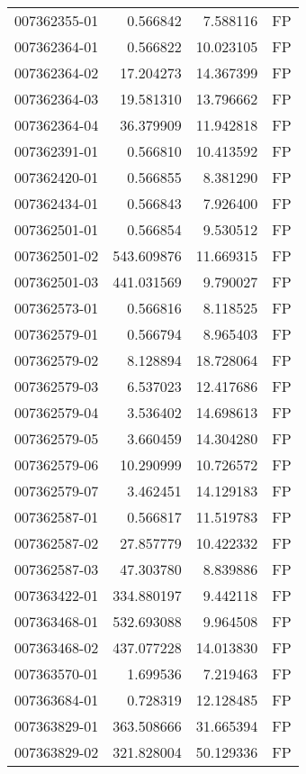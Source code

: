 \begin{tabular}{lrrl}
007362355-01 &    0.566842 &     7.588116 &   FP \\
007362364-01 &    0.566822 &    10.023105 &   FP \\
007362364-02 &   17.204273 &    14.367399 &   FP \\
007362364-03 &   19.581310 &    13.796662 &   FP \\
007362364-04 &   36.379909 &    11.942818 &   FP \\
007362391-01 &    0.566810 &    10.413592 &   FP \\
007362420-01 &    0.566855 &     8.381290 &   FP \\
007362434-01 &    0.566843 &     7.926400 &   FP \\
007362501-01 &    0.566854 &     9.530512 &   FP \\
007362501-02 &  543.609876 &    11.669315 &   FP \\
007362501-03 &  441.031569 &     9.790027 &   FP \\
007362573-01 &    0.566816 &     8.118525 &   FP \\
007362579-01 &    0.566794 &     8.965403 &   FP \\
007362579-02 &    8.128894 &    18.728064 &   FP \\
007362579-03 &    6.537023 &    12.417686 &   FP \\
007362579-04 &    3.536402 &    14.698613 &   FP \\
007362579-05 &    3.660459 &    14.304280 &   FP \\
007362579-06 &   10.290999 &    10.726572 &   FP \\
007362579-07 &    3.462451 &    14.129183 &   FP \\
007362587-01 &    0.566817 &    11.519783 &   FP \\
007362587-02 &   27.857779 &    10.422332 &   FP \\
007362587-03 &   47.303780 &     8.839886 &   FP \\
007363422-01 &  334.880197 &     9.442118 &   FP \\
007363468-01 &  532.693088 &     9.964508 &   FP \\
007363468-02 &  437.077228 &    14.013830 &   FP \\
007363570-01 &    1.699536 &     7.219463 &   FP \\
007363684-01 &    0.728319 &    12.128485 &   FP \\
007363829-01 &  363.508666 &    31.665394 &   FP \\
007363829-02 &  321.828004 &    50.129336 &   FP \\

\end{tabular}
